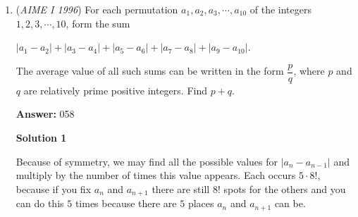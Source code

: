 \begin{enumerate}
\textbf{Solution 6}

Add 1 to both sides of the equation to get $x^6+x^4+x^3+x^2+1+1=1$. We can rearrange to find that $(x^6+x^3+1)+(x^4+x^2+1)=1$. Then, using sum of a geometric series, $\frac{x^9-1}{x^3-1}+\frac{x^6-1}{x^2-1}=1$.

 Combining the two terms of the LHS, we get that $\frac{x^{11}-x^9-x^2+1+x^9-x^6-x^3+1}{x^5-x^3-x^2+1}=1$, so $x^{11}-x^6-x^3-x^2+2=x^5-x^3-x^2+1$, and simplifying, we see that $x^{11}-x^6-x^5+1=0$, so by SFFT, $(x^6-1)(x^5-1)=0$. Then, the roots of our polynomial are the fifth and sixth roots of unity. However, looking back at our expression when it had fractions, we realize that if $x$ is a second or third root of unity, it would cause a denominator to be zero, so the roots of our polynomial are the fifth and sixth roots of unity that are not the second or third roots of unity. The only roots in this category are $\mathrm{cis} (60, 72, 144)$, so our desired sum is $\boxed{276}$, and we are done.

 -coolak

 



\textbf{Solution 7}

Take accout of the $Z^3$ and use the formula $(x^n-1)(x^m+x^{m-n}+...+1) = x^{m+n}-1$

 Then factorise the function to solve $Z^5=1$, $Z^3 \neq 1$, $Z^2 \neq 1$



	\item (\textit{AIME I 1996}) For each permutation $a_1,a_2,a_3,\cdots,a_{10}$ of the integers $1,2,3,\cdots,10$, form the sum


 $|a_1-a_2|+|a_3-a_4|+|a_5-a_6|+|a_7-a_8|+|a_9-a_{10}|$.


 The average value of all such sums can be written in the form $\dfrac{p}{q}$, where $p$ and $q$ are relatively prime positive integers. Find $p+q$.


 
 \textbf{Answer: }058



\textbf{Solution 1}

Because of symmetry, we may find all the possible values for $|a_n - a_{n - 1}|$ and multiply by the number of times this value appears. Each occurs $5 \cdot 8!$, because if you fix $a_n$ and $a_{n + 1}$ there are still $8!$ spots for the others and you can do this $5$ times because there are $5$ places $a_n$ and $a_{n + 1}$ can be.


\end{enumerate}
